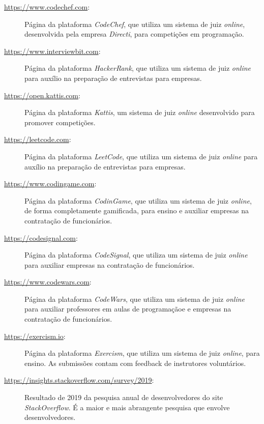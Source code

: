 \begin{description}
\label{link:code_chef}
  \item[\url{https://www.codechef.com}:]  Página da plataforma \emph{CodeChef}, 
    que utiliza um sistema de juiz \emph{online}, desenvolvida pela empresa \emph{Directi},
    para competições em programação.

\label{link:interview_bit}
  \item[\url{https://www.interviewbit.com}:]  Página da plataforma \emph{HackerRank}, 
    que utiliza um sistema de juiz \emph{online} para auxílio na preparação de entrevistas
    para empresas.

\label{link:kattis}
  \item[\url{https://open.kattis.com}:] Página da plataforma \emph{Kattis}, um sistema
    de juiz \emph{online} desenvolvido para promover competições.

    \label{link:leet_code}
  \item[\url{https://leetcode.com}:]  Página da plataforma \emph{LeetCode}, 
    que utiliza um sistema de juiz \emph{online} para auxílio na preparação de entrevistas
    para empresas.

    \label{link:codin_game}
  \item[\url{https://www.codingame.com}:]  Página da plataforma \emph{CodinGame}, 
    que utiliza um sistema de juiz \emph{online}, de forma completamente gamificada,
    para ensino e auxiliar empresas na contratação de funcionários.

    \label{link:code_signal}
  \item[\url{https://codesignal.com}:]  Página da plataforma \emph{CodeSignal}, 
    que utiliza um sistema de juiz \emph{online} para auxiliar empresas 
    na contratação de funcionários.

    \label{link:code_wars}
  \item[\url{https://www.codewars.com}:]  Página da plataforma \emph{CodeWars}, 
    que utiliza um sistema de juiz \emph{online} para auxiliar professores em aulas 
    de programaçãoe e empresas na contratação de funcionários.

    \label{link:exercism}
  \item[\url{https://exercism.io}:]  Página da plataforma \emph{Exercism}, 
    que utiliza um sistema de juiz \emph{online}, para ensino. As submissões
    contam com feedback de instrutores voluntários.

    \label{link:so_survey}
  \item[\url{https://insights.stackoverflow.com/survey/2019}:] Resultado de 2019 da pesquisa 
    anual de desenvolvedores do site \emph{StackOverflow}. É a maior e 
    mais abrangente pesquisa que envolve desenvolvedores.


\end{description}
